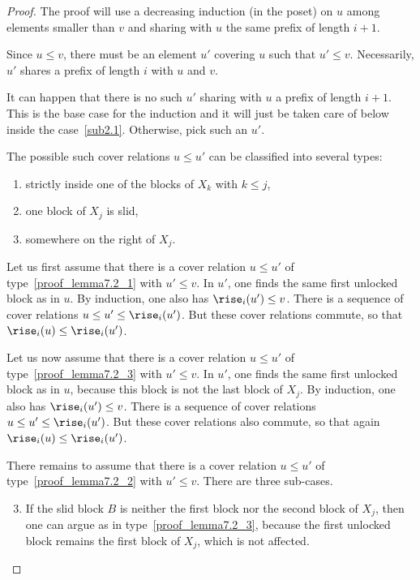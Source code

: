 \begin{proof}
  The proof will use a decreasing induction (in the poset) on $u$
  among elements smaller than $v$ and sharing with $u$ the same prefix
  of length $i+1$.

  Since $u \leq v$, there must be an element $u'$ covering $u$ such
  that $u' \leq v$. Necessarily, $u'$ shares a prefix of length $i$
  with $u$ and $v$.

  It can happen that there is no such $u'$ sharing with $u$ a prefix
  of length $i+1$. This is the base case for the induction and it will
  just be taken care of below inside the case~\ref{sub2.1}. Otherwise, pick
  such an $u'$.

  \smallskip

  The possible such cover relations $u \leq u'$ can be classified into several types:
  \begin{enumerate}%
  \item\label{proof_lemma7.2_1} strictly inside one of the blocks of $X_k$ with $k \leq j$,
  \item\label{proof_lemma7.2_2} one block of $X_j$ is slid,
  \item\label{proof_lemma7.2_3} somewhere on the right of $X_j$.

  \end{enumerate}

  Let us first assume that there is a cover relation $u \leq u'$ of type~\eqref{proof_lemma7.2_1}
  with $u' \leq v$. In $u'$, one finds the same first unlocked block
  as in $u$. By induction, one also has $\rise_i(u') \leq v$. There
  is a sequence of cover relations $u \leq u' \leq \rise_i(u')$. But these
  cover relations commute, so that $\rise_i(u) \leq \rise_i(u')$.

  Let us now assume that there is a cover relation $u \leq u'$ of type~\eqref{proof_lemma7.2_3} with $u' \leq v$. In $u'$, one finds the same first unlocked
  block as in $u$, because this block is not the last block of
  $X_j$. By induction, one also has $\rise_i(u') \leq v$. There is a
  sequence of cover relations $u \leq u' \leq \rise_i(u')$. But these
  cover relations also commute, so that again
  $\rise_i(u) \leq \rise_i(u')$.

  There remains to assume that there is a cover relation $u \leq u'$
  of type~\eqref{proof_lemma7.2_2} with $u' \leq v$. There are three sub-cases.

  \begin{enumerate}
%
\setcounter{enumi}{2}
\item\label{sub2.3} 
  If the slid block $B$ is neither the
  first block nor the second block of $X_j$, then one can argue as in
  type~\eqref{proof_lemma7.2_3}, because the first unlocked block remains the
  first block of $X_j$, which is not affected.


\end{enumerate}
\end{proof}
